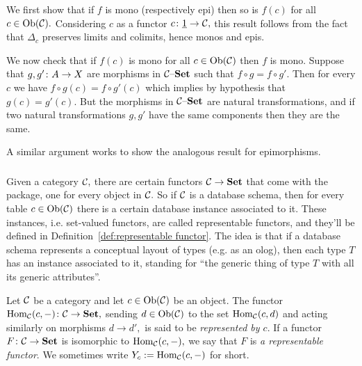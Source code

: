 \documentclass[CT4S-EN-RU]{subfiles}
\begin{document}
\begin{proofENG}
We first show that if $f$ is mono (respectively epi) then so is $f(c)$ for all $c\in\textnormal{Ob}(\mathcal{C}).$ Considering $c$ as a functor $c\colon\underline{1}\rightarrow\mathcal{C},$ this result follows from the fact that $\Delta_c$ preserves limits and colimits, hence monos and epis. 

We now check that if $f(c)$ is mono for all $c\in\textnormal{Ob}(\mathcal{C})$ then $f$ is mono. Suppose that $g,g'\colon A\rightarrow X$ are morphisms in $\mathcal{C}{\text \textendash}{\mathbf{Set}}$ such that $f\circ g=f\circ g'.$ Then for every $c$ we have $f\circ g(c)=f\circ g'(c)$ which implies by hypothesis that $g(c)=g'(c).$ But the morphisms in $\mathcal{C}{\text \textendash}{\mathbf{Set}}$ are natural transformations, and if two natural transformations $g,g'$ have the same components then they are the same. 

A similar argument works to show the analogous result for epimorphisms.
\end{proofENG}

\begin{proofRUS}
\end{proofRUS}


\subsubsection{}\label{sec:representable functors}

\begin{blockENG}
Given a category $\mathcal{C},$ there are certain functors $\mathcal{C}\rightarrow{\mathbf{Set}}$ that come with the package, one for every object in $\mathcal{C}.$ So if $\mathcal{C}$ is a database schema, then for every table $c\in\textnormal{Ob}(\mathcal{C})$ there is a certain database instance associated to it. These instances, i.e. set-valued functors, are called representable functors, and they'll be defined in Definition~\ref{def:representable functor}. The idea is that if a database schema represents a conceptual layout of types (e.g. as an olog), then each type $T$ has an instance associated to it, standing for “the generic thing of type $T$ with all its generic attributes”.
\end{blockENG}

\begin{blockRUS}
\end{blockRUS}

\begin{definitionENG}\label{def:representable functor}
Let $\mathcal{C}$ be a category and let $c\in\textnormal{Ob}(\mathcal{C})$ be an object. The functor $\textnormal{Hom}_\mathcal{C}(c,-)\colon\mathcal{C}\rightarrow{\mathbf{Set}},$ sending $d\in\textnormal{Ob}(\mathcal{C})$ to the set $\textnormal{Hom}_\mathcal{C}(c,d)$ and acting similarly on morphisms $d\to d',$ is said to be {\em represented by $c$}. If a functor $F\colon\mathcal{C}\rightarrow{\mathbf{Set}}$ is isomorphic to $\textnormal{Hom}_\mathcal{C}(c,-),$ we say that $F$ is {\em a representable functor}. We sometimes write $Y_c:=\textnormal{Hom}_\mathcal{C}(c,-)$ for short.
\end{definitionENG}
\end{document}
